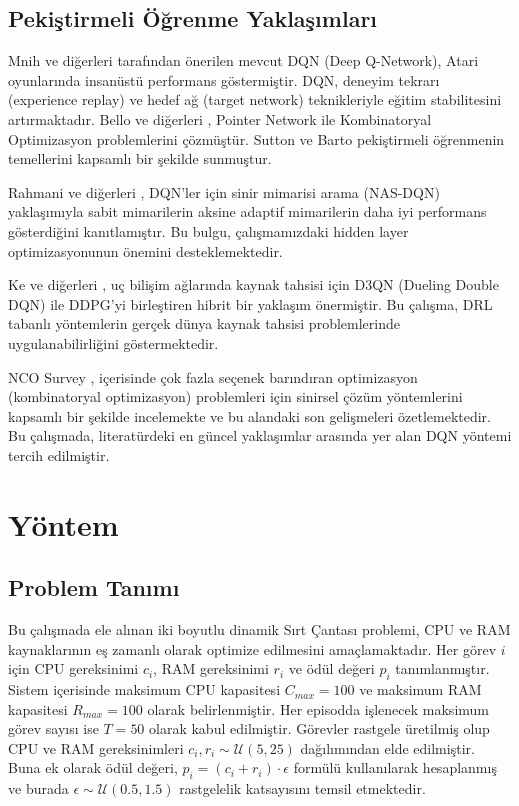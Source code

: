 \documentclass[onecolumn]{IEEEtran}
\begin{document}
\subsection{Pekiştirmeli Öğrenme Yaklaşımları}

Mnih ve diğerleri \cite{mnih2015human} tarafından önerilen mevcut  DQN (Deep Q-Network), Atari oyunlarında insanüstü performans göstermiştir. DQN, deneyim tekrarı (experience replay) ve hedef ağ (target network) teknikleriyle eğitim stabilitesini artırmaktadır. Bello ve diğerleri \cite{bello2016neural}, Pointer Network ile Kombinatoryal Optimizasyon problemlerini çözmüştür. Sutton ve Barto \cite{sutton2018reinforcement} pekiştirmeli öğrenmenin temellerini kapsamlı bir şekilde sunmuştur.

Rahmani ve diğerleri \cite{rahmani2025integrated}, DQN'ler için sinir mimarisi arama (NAS-DQN) yaklaşımıyla sabit mimarilerin aksine adaptif mimarilerin daha iyi performans gösterdiğini kanıtlamıştır. Bu bulgu, çalışmamızdaki hidden layer optimizasyonunun önemini desteklemektedir.

Ke ve diğerleri \cite{ke2025hybrid}, uç bilişim ağlarında kaynak tahsisi için D3QN (Dueling Double DQN) ile DDPG'yi birleştiren hibrit bir yaklaşım önermiştir. Bu çalışma, DRL tabanlı yöntemlerin gerçek dünya kaynak tahsisi problemlerinde uygulanabilirliğini göstermektedir.

NCO Survey \cite{nco2024survey}, içerisinde çok fazla seçenek barındıran optimizasyon (kombinatoryal optimizasyon) problemleri için sinirsel çözüm yöntemlerini kapsamlı bir şekilde incelemekte ve bu alandaki son gelişmeleri özetlemektedir. Bu çalışmada, literatürdeki en güncel yaklaşımlar arasında yer alan DQN yöntemi tercih edilmiştir.

\section{Yöntem}

\subsection{Problem Tanımı}

Bu çalışmada ele alınan iki boyutlu dinamik Sırt Çantası problemi, CPU ve RAM kaynaklarının eş zamanlı olarak optimize edilmesini amaçlamaktadır. Her görev $i$ için CPU gereksinimi $c_i$, RAM gereksinimi $r_i$ ve ödül değeri $p_i$ tanımlanmıştır. Sistem içerisinde maksimum CPU kapasitesi $C_{max} = 100$ ve maksimum RAM kapasitesi $R_{max} = 100$ olarak belirlenmiştir. Her episodda işlenecek maksimum görev sayısı ise $T = 50$ olarak kabul edilmiştir. Görevler rastgele üretilmiş olup CPU ve RAM gereksinimleri $c_i, r_i \sim \mathcal{U}(5,25)$ dağılımından elde edilmiştir. Buna ek olarak ödül değeri, $p_i = (c_i + r_i) \cdot \epsilon$ formülü kullanılarak hesaplanmış ve burada $\epsilon \sim \mathcal{U}(0.5, 1.5)$ rastgelelik katsayısını temsil etmektedir.
\end{document}

